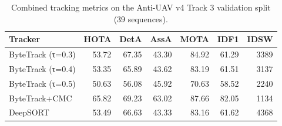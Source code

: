 \begin{table}
\caption{Combined tracking metrics on the Anti-UAV v4 Track 3 validation split (39 sequences).}
\label{tab:tracking_results}
\begin{tabular}{lrrrrrr}
\toprule
Tracker & HOTA & DetA & AssA & MOTA & IDF1 & IDSW \\
\midrule
ByteTrack (τ=0.3) & 53.72 & 67.35 & 43.30 & 84.92 & 61.29 & 3389 \\
ByteTrack (τ=0.4) & 53.35 & 65.89 & 43.62 & 83.19 & 61.51 & 3137 \\
ByteTrack (τ=0.5) & 50.63 & 56.08 & 45.92 & 70.63 & 58.52 & 2240 \\
ByteTrack+CMC & 65.82 & 69.23 & 63.02 & 87.66 & 82.05 & 1134 \\
DeepSORT & 53.49 & 66.63 & 43.33 & 83.16 & 61.62 & 4368 \\
\bottomrule
\end{tabular}
\end{table}
